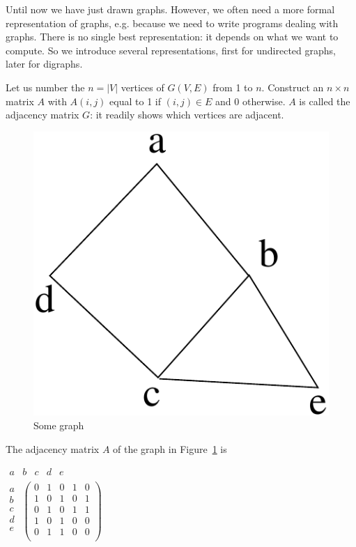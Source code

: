 Until now we have just drawn graphs. However, we often need a more
formal representation of graphs, e.g. because we need to write
programs dealing with graphs. There is no single best representation:
it depends on what we want to compute. So we introduce several
representations, first for undirected graphs, later for digraphs.

Let us number the $n = |V|$ vertices of $G(V,E)$ from 1 to
$n$. Construct an $n\times n$ matrix $A$ with $A(i,j)$ equal to 1 if
$(i,j) \in E$ and 0 otherwise. $A$ is called the adjacency matrix $G$:
it readily shows which vertices are adjacent.

\begin{figure}[ht]
\begin{center}
\includegraphics[width=0.15\linewidth,keepaspectratio]{adjacency1}
\end{center}
\caption{ Some graph \label{adjacency1}}
\end{figure}

\begin{example}
The adjacency matrix $A$ of the graph in Figure~\ref{adjacency1} is

\begin{center}
\mbox{\space \space \space}
$\begin{array}{ccccc}
a & b & c & d & e\\
\end{array}
$\\
$
\begin{array}{c}
a\\
b\\
c\\
d\\
e\\
\end{array}
$
$
\left(
\begin{array}{ccccc}
0 & 1 & 0 & 1 & 0\\
1 & 0 & 1 & 0 & 1\\
0 & 1 & 0 & 1 & 1\\
1 & 0 & 1 & 0 & 0\\
0 & 1 & 1 & 0 & 0\\
\end{array}
\right)
$
\end{center}
\end{example}

